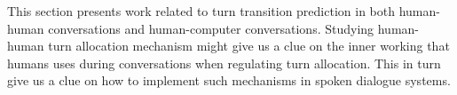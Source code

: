 This section presents work related to turn transition prediction in both human-human conversations and human-computer conversations. Studying human-human turn allocation mechanism might give us a clue on the inner working that humans uses during conversations when regulating turn allocation. This in turn give us a clue on how to implement such mechanisms in spoken dialogue systems.
